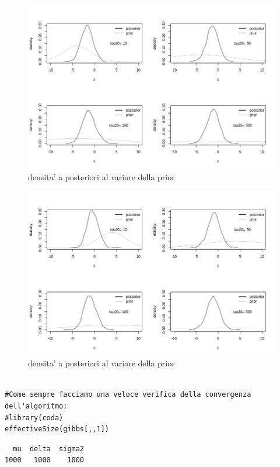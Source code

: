 \begin{itemize}
\begin{lstlisting}[style=R]
\end{lstlisting}
\begin{figure}
 \centering
 \includegraphics[scale=0.7]{img/esercizio8-2-2}
 \caption{densita' a posteriori al variare della prior}
 \label{figure:figura13}
\end{figure}

\begin{figure}
 \centering
 \includegraphics[scale=0.7]{img/esercizio8-2-3}
 \caption{densita' a posteriori al variare della prior}
 \label{figure:figura14}
\end{figure}
\begin{lstlisting}[style=R]

#Come sempre facciamo una veloce verifica della convergenza dell'algoritmo:
#library(coda)
effectiveSize(gibbs[,,1])
\end{lstlisting}

{
\color{red}
\begin{Verbatim}
  mu  delta  sigma2
1000   1000    1000
\end{Verbatim}
}



\end{itemize}


